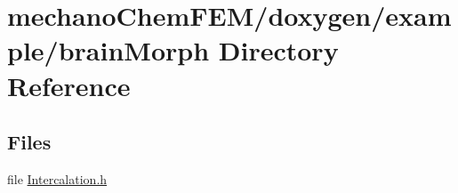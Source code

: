 \section{mechano\-Chem\-F\-E\-M/doxygen/example/brain\-Morph Directory Reference}
\label{dir_177cb805c9f4e8a749c682bac9a90b34}
\subsection*{Files}
\begin{DoxyCompactItemize}
\item 
file \hyperlink{_intercalation_8h}{Intercalation.\-h}
\end{DoxyCompactItemize}
